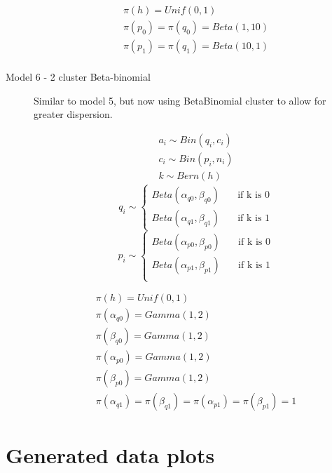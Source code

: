 \documentclass[11pt,a4,singlespacing,titlepagenumber=on]{scrreprt}
\numberwithin{equation}{chapter} %
\theoremstyle{remark}
\begin{document}
\begin{description}
 \begin{align}
	\pi(h) = Unif(0,1) \\
	\pi(p_0) = \pi(q_0) = Beta(1,10) \\
	\pi(p_1) = \pi(q_1) = Beta(10,1) \\
\end{align}


	\item[Model 6 - 2 cluster Beta-binomial]

Similar to model 5, but now using BetaBinomial cluster to allow for greater dispersion.

 \begin{align}
	a_i \sim Bin(q_i,c_i) \\
	c_i \sim Bin(p_i,n_i) \\
	k \sim Bern(h) 
\end{align}
	\[ 
	q_i \sim 
  	\begin{cases}
		Beta(\alpha_{q0},\beta_{q0}) & \quad \text{if k is 0}\\
		Beta(\alpha_{q1},\beta_{q1}) & \quad \text{if k is 1}
	\end{cases}
	\]
	\[
	p_i \sim 
  	\begin{cases}
		Beta(\alpha_{p0},\beta_{p0}) & \quad \text{if k is 0}\\
		Beta(\alpha_{p1},\beta_{p1}) & \quad \text{if k is 1}\\
	\end{cases}
	\]

 \begin{align}
	\pi(h) = Unif(0,1) \\
	\pi(\alpha_{q0}) = Gamma(1,2) \\
	\pi(\beta_{q0}) = Gamma(1,2) \\
	\pi(\alpha_{p0}) = Gamma(1,2) \\
	\pi(\beta_{p0}) = Gamma(1,2) \\
	\pi(\alpha_{q1}) = \pi(\beta_{q1}) = \pi(\alpha_{p1}) = \pi(\beta_{p1}) = 1
\end{align}


%
%
\end{description}


\section{Generated data plots}
\end{document}
